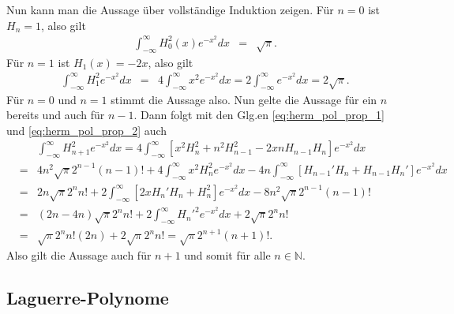 \documentclass{book}
\begin{document}
Nun kann man die Aussage über vollständige Induktion zeigen. Für $n = 0$ ist $H_n = 1$, also gilt
%
\begin{eqnarray}
\int_{ - \infty}^{\infty}H_0^2\left(x\right)e^{-x^2}dx & = & \sqrt{\pi}.
\end{eqnarray}
%
Für $n = 1$ ist $H_1\left(x\right) = -2x$, also gilt
%
\begin{eqnarray}
\int_{ - \infty}^{\infty}H_1^2e^{-x^2}dx & = & 4\int_{ - \infty}^{\infty}x^2e^{-x^2}dx = 2\int_{ - \infty}^{\infty}e^{-x^2}dx = 2\sqrt{\pi}.
\end{eqnarray}
%
Für $n = 0$ und $n = 1$ stimmt die Aussage also. Nun gelte die Aussage für ein $n$ bereits und auch für $n - 1$. Dann folgt mit den Glg.en \eqref{eq:herm_pol_prop_1} und \eqref{eq:herm_pol_prop_2} auch
%
\begin{eqnarray}
&&\int_{ - \infty}^{\infty}H_{n + 1}^2e^{-x^2}dx = 4\int_{ - \infty}^{\infty}\left[x^2H_n^2 + n^2H_{n - 1}^2 - 2xnH_{n - 1}H_n\right]e^{-x^2}dx\nonumber\\
& = & 4n^2\sqrt{\pi}2^{n - 1}\left(n - 1\right)! + 4\int_{ - \infty}^{\infty}x^2H_n^2e^{-x^2}dx - 4n\int_{ - \infty}^{\infty}\left[H_{n - 1}'H_{n} + H_{n - 1}H_n'\right]e^{-x^2}dx\nonumber\\
& = & 2n\sqrt{\pi}2^nn! + 2\int_{ - \infty}^{\infty}\left[2xH_n'H_n + H_n^2\right]e^{-x^2}dx - 8n^2\sqrt{\pi}2^{n - 1}\left(n - 1\right)!\nonumber\\
& = & \left(2n - 4n\right)\sqrt{\pi}2^nn! + 2\int_{ - \infty}^{\infty}H_n'^2e^{-x^2}dx + 2\sqrt{\pi}2^nn!\nonumber\\
& = & \sqrt{\pi}2^nn!\left(2n\right) + 2\sqrt{\pi}2^nn! = \sqrt{\pi}2^{n + 1}\left(n + 1\right)!.
\end{eqnarray}
%
Also gilt die Aussage auch für $n + 1$ und somit für alle $n\in\mathbb{N}$.

\subsection{Laguerre-Polynome}
\label{sec:laguerrepolynome}
\end{document}
